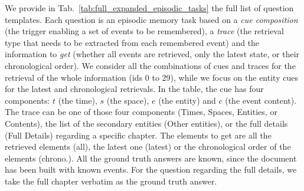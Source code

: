 \documentclass{article}
\begin{document}
We provide in Tab.~\ref{tab:full_expanded_episodic_tasks} the full list of question templates. Each question is an episodic memory task based on a \emph{cue composition} (the trigger enabling a set of events to be remembered), a \emph{trace} (the retrieval type that needs to be extracted from each remembered event) and the information to \emph{get} (whether all events are retrieved, only the latest state, or their chronological order). We consider all the combinations of cues and traces for the retrieval of the whole information (ids 0 to 29), while we focus on the entity cues for the latest and chronological retrievals. 
In the table, the cue has four components: $t$ (the time), $s$ (the space), $e$ (the entity) and $c$ (the event content). The trace can be one of those four components (Times, Spaces, Entities, or Contents), the list of the secondary entities (Other entities), or the full details (Full Details) regarding a specific chapter. The elements to get are all the retrieved elements (all), the latest one (latest) or the chronological order of the elements (chrono.). All the ground truth answers are known, since the document has been built with known events. For the question regarding the full details, we take the full chapter verbatim as the ground truth answer.
\end{document}
